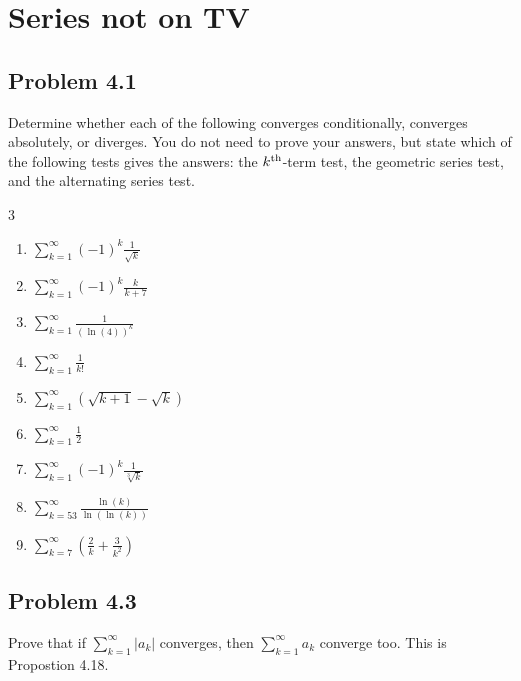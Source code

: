 \documentclass[12pt]{report}
\begin{document}
\renewcommand\qedsymbol{OE$\Delta$}
\newcommand{\abs}[1]{\left| #1 \right|}
\newcommand{\andtxt}{\text{ and }}
\newcommand{\mathif}{\text{if }}
\newcommand{\seq}[2][n]{\ensuremath{(#2 _{#1})}}

\tableofcontents
\pagebreak

\setcounter{chapter}{3}
\chapter{Series not on TV}

\section{Problem 4.1}
    Determine whether each of the following converges conditionally, converges absolutely, or diverges. 
    You do not need  to prove your answers, but state which of the following tests gives the answers: the $k^{\rm th}$-term test, the geometric series test, and the alternating series test.
    \begin{multicols}{3}
        \begin{enumerate}[label=(\alph*)]
            \item   $\sum_{k = 1}^{\infty}  (-1)^k \frac{1}{\sqrt{k}}$
            \item   $\sum_{k = 1}^{\infty}  (-1)^k \frac{k}{k + 7}$
            \item   $\sum_{k = 1}^{\infty}  \frac{1}{(\ln(4))^k}$
            \item   $\sum_{k = 1}^{\infty}  \frac{1}{k!}$
            \item   {\scriptsize $\sum_{k = 1}^{\infty}  (\sqrt{k + 1} - \sqrt{k})$}
            \item   $\sum_{k = 1}^{\infty}  \frac{1}{2}$
            \item   $\sum_{k = 1}^{\infty}  (-1)^k \frac{1}{\sqrt[3]{k}}$
            \item   $\sum_{k = 53}^{\infty} \frac{\ln(k)}{\ln(\ln(k))}$
            \item   $\sum_{k = 7}^{\infty}  \left( \frac{2}{k} + \frac{3}{k^2} \right)$
        \end{enumerate}
    \end{multicols}

\section{Problem 4.3}
    Prove that if $\sum_{k = 1}^{\infty} \abs{a_k}$ converges, then $\sum_{k = 1}^{\infty} a_k$ converge too.
    This is Propostion 4.18.
\end{document}
